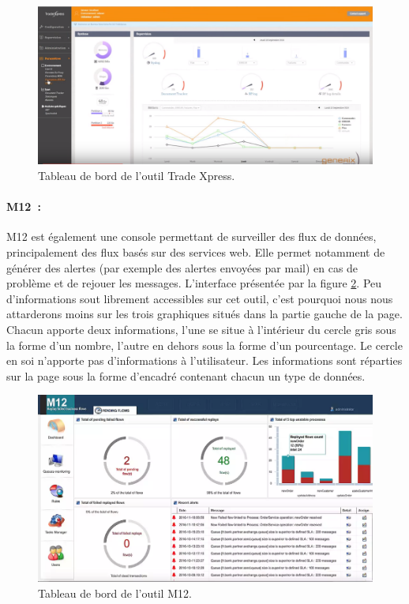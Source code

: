 			\begin{figure}[H]
				\centering
				\includegraphics[width=16cm]{../img/part2/trade_xpress.png}
				\caption{\label{trade_xpress} Tableau de bord de l'outil Trade Xpress.}
			\end{figure}
			
			\paragraph{M12~:}
			M12 est également une console permettant de surveiller des flux de données,
			principalement des flux basés sur des services web. Elle permet notamment de
			générer des alertes (par exemple des alertes envoyées par mail) en cas de
			problème et de rejouer les messages.\newline
			L'interface présentée par la figure \ref{m12}. Peu d'informations sout
			librement accessibles sur cet outil, c'est pourquoi nous nous attarderons
			moins sur les trois graphiques situés dans la partie gauche de la page.
			Chacun apporte deux informations, l'une se situe à l'intérieur du cercle
			gris sous la forme d'un nombre, l'autre en dehors sous la forme d'un
			pourcentage. Le cercle en soi n'apporte pas d'informations à
			l'utilisateur.\newline
			Les informations sont réparties sur la page sous la
			forme d'encadré contenant chacun un type de données.
			\begin{figure}[H]
				\centering
				\includegraphics[width=16cm]{../img/part2/m12.png}
				\caption{\label{m12} Tableau de bord de l'outil M12.}
			\end{figure}
			
